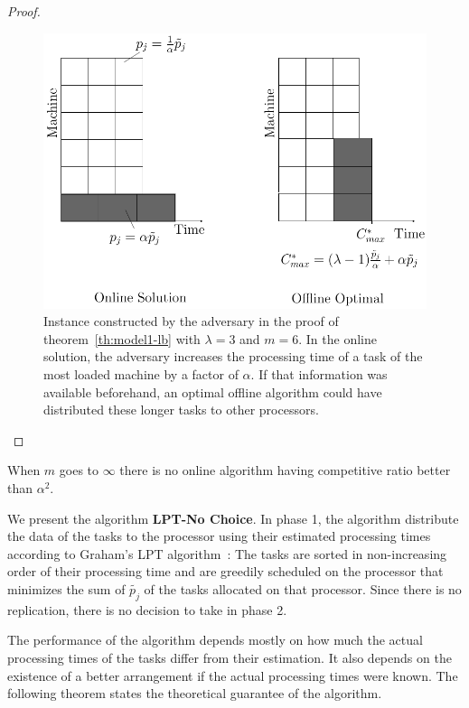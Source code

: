 \begin{proof}
  \begin{figure}[htp]
  \centering
  \includegraphics[width= 12 cm]{model1.pdf}
  \caption{Instance constructed by the adversary in the proof of
    theorem~\ref{th:model1-lb} with $\lambda = 3$ and $m = 6$. In the
    online solution, the adversary increases 
    the processing time of a task of the most loaded machine by a factor of $\alpha$. If
    that information was available beforehand, an optimal offline
    algorithm could have distributed these longer tasks to other
    processors.}
  \label{fig:rara}
  \end{figure}
\end{proof}    
  
  
  \begin{corollary}
  When $m$ goes to $\infty$ there is no online algorithm having competitive ratio better than $\alpha^{2}$.
  \end{corollary}
  

We present the algorithm \textbf{LPT-No Choice}. In phase 1, the
algorithm distribute the data of the tasks to the processor using
their estimated processing times according to Graham's LPT
algorithm~\cite{Graham69boundson}: The tasks are sorted in non-increasing
order of their processing time and are greedily scheduled on the
processor that minimizes the sum of $\tilde{p_j}$ of the tasks
allocated on that processor. Since there is no replication, there is
no decision to take in phase 2.

The performance of the algorithm depends mostly on how much the actual
processing times of the tasks differ from their estimation. It also depends on the
existence of a better arrangement if the actual processing times were
known. The following theorem states the theoretical guarantee of the
algorithm.

